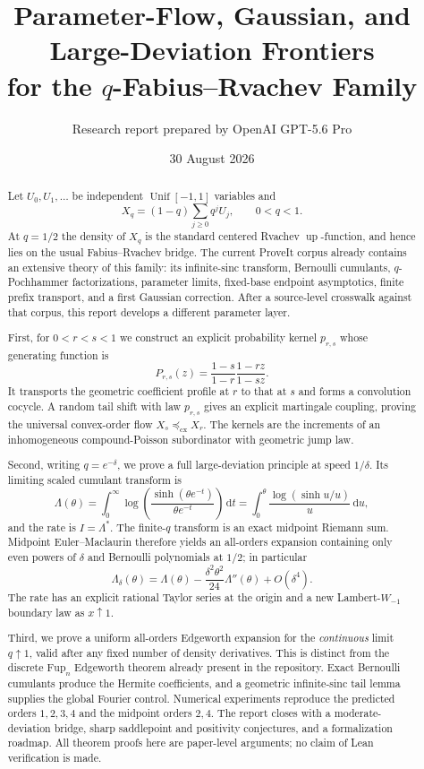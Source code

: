 \documentclass[11pt,a4paper]{article}
\title{\bfseries Parameter-Flow, Gaussian, and Large-Deviation Frontiers\\[2mm]
for the $q$-Fabius--Rvachev Family}
\author{Research report prepared by OpenAI GPT-5.6 Pro}
\date{30 August 2026}
\theoremstyle{definition}
\newcommand{\Up}{\operatorname{up}}
\newcommand{\dd}{\,\mathrm{d}}
\newcommand{\1}{\mathbf{1}}
\begin{document}
\maketitle

\begin{abstract}
Let $U_0,U_1,\ldots$ be independent $\operatorname{Unif}[-1,1]$ variables and
\[
  X_q=(1-q)\sum_{j\ge0}q^jU_j,\qquad 0<q<1.
\]
At $q=1/2$ the density of $X_q$ is the standard centered Rvachev
$\Up$-function, and hence lies on the usual Fabius--Rvachev bridge.  The
current ProveIt corpus already contains an extensive theory of this family:
its infinite-sinc transform, Bernoulli cumulants, $q$-Pochhammer
factorizations, parameter limits, fixed-base endpoint asymptotics, finite
prefix transport, and a first Gaussian correction.  After a source-level
crosswalk against that corpus, this report develops a different parameter
layer.

First, for $0<r<s<1$ we construct an explicit probability kernel
$p_{r,s}$ whose generating function is
\[
  P_{r,s}(z)=\frac{1-s}{1-r}\frac{1-rz}{1-sz}.
\]
It transports the geometric coefficient profile at $r$ to that at $s$ and
forms a convolution cocycle.  A random tail shift with law $p_{r,s}$ gives an
explicit martingale coupling, proving the universal convex-order flow
$X_s\preceq_{\mathrm{cx}}X_r$.  The kernels are the increments of an
inhomogeneous compound-Poisson subordinator with geometric jump law.

Second, writing $q=e^{-\delta}$, we prove a full large-deviation principle at
speed $1/\delta$.  Its limiting scaled cumulant transform is
\[
 \Lambda(\theta)=\int_0^\infty
     \log\!\left(\frac{\sinh(\theta e^{-t})}{\theta e^{-t}}\right)\dd t
 =\int_0^\theta\frac{\log(\sinh u/u)}{u}\dd u,
\]
and the rate is $I=\Lambda^*$.  The finite-$q$ transform is an exact midpoint
Riemann sum.  Midpoint Euler--Maclaurin therefore yields an all-orders
expansion containing only even powers of $\delta$ and Bernoulli polynomials
at $1/2$; in particular
\[
 \Lambda_\delta(\theta)=\Lambda(\theta)
 -\frac{\delta^2\theta^2}{24}\Lambda''(\theta)+O(\delta^4).
\]
The rate has an explicit rational Taylor series at the origin and a new
Lambert-$W_{-1}$ boundary law as $x\uparrow1$.

Third, we prove a uniform all-orders Edgeworth expansion for the
\emph{continuous} limit $q\uparrow1$, valid after any fixed number of density
derivatives.  This is distinct from the discrete $\mathrm{Fup}_n$ Edgeworth
theorem already present in the repository.  Exact Bernoulli cumulants produce
the Hermite coefficients, and a geometric infinite-sinc tail lemma supplies
the global Fourier control.  Numerical experiments reproduce the predicted
orders $1,2,3,4$ and the midpoint orders $2,4$.  The report closes with a
moderate-deviation bridge, sharp saddlepoint and positivity conjectures, and
a formalization roadmap.  All theorem proofs here are paper-level arguments;
no claim of Lean verification is made.
\end{abstract}
\end{document}
